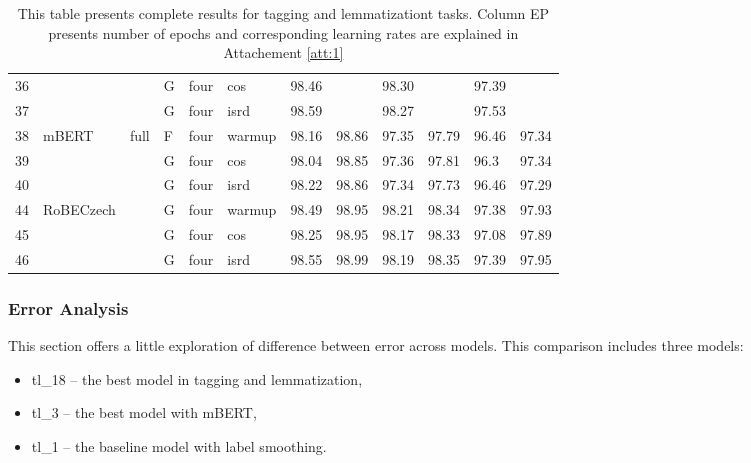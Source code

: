 \begin{table}[!h]
{\begin{tabular}{|l|l|l|l|l|l||llllll|}
36 &                              &                         & G	& four                     & cos    & 98.46  &         & 98.30   &          & 97.39     &            \\ \cline{1-1} \cline{4-12}
37 &                              &                         & G	& four                     & isrd   & 98.59  &         & 98.27   &          & 97.53     &            \\ \hline
38 & \multirow{3}{*}{mBERT}       & \multirow{9}{*}{full}   & F	& four                     & warmup & 98.16  & 98.86   & 97.35   & 97.79    & 96.46     & 97.34      \\ \cline{1-1} \cline{4-12}
39 &                              &                         & G	& four                     & cos    & 98.04  & 98.85   & 97.36   & 97.81    & 96.3      & 97.34      \\ \cline{1-1} \cline{4-12}
40 &                              &                         & G	& four                     & isrd   & 98.22  & 98.86   & 97.34   & 97.73    & 96.46     & 97.29      \\ \cline{1-2} \cline{4-12}
44 & \multirow{3}{*}{RoBECzech}   &                         & G	& four                     & warmup & 98.49  & 98.95   & 98.21   & 98.34    & 97.38     & 97.93      \\ \cline{1-1} \cline{4-12}
45 &                              &                         & G	& four                     & cos    & 98.25  & 98.95   & 98.17   & 98.33    & 97.08     & 97.89      \\ \cline{1-1} \cline{4-12}
46 &                              &                         & G	& four                     & isrd   & 98.55  & 98.99   & 98.19   & 98.35    & 97.39     & 97.95      \\ \hline

\end{tabular}
}
\caption{This table presents complete results for tagging and lemmatizationt tasks. Column EP presents number of epochs and corresponding learning rates are explained in Attachement \protect\ref{att:1} }
\label{tab:all_res_tl}
\end{table}

\subsubsection{Error Analysis}
This section offers a little exploration of difference between error across models. This comparison includes three models: 
\begin{itemize}
\item tl\_18 -- the best model in tagging and lemmatization,
\item tl\_3 -- the best model with mBERT,
\item tl\_1 -- the baseline model with label smoothing.
\end{itemize} 


